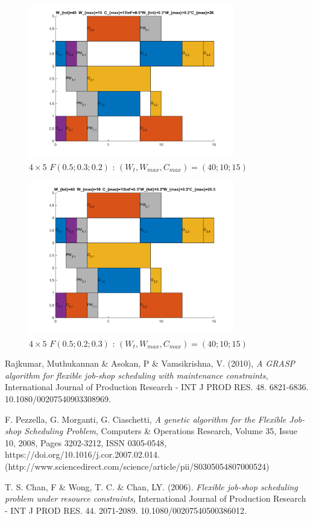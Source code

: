 \documentclass[10pt,a4paper]{scrartcl}
\begin{document}
\begin{figure}
  \centering
  \includegraphics[width=0.8\textwidth]{img/results4x5_F050302.png}
  \caption{$4 \times 5$ $F(0.5;0.3;0.2)$ : $(W_t, W_{max}, C_{max}) = (40; 10; 15)$}
\end{figure}
\begin{figure}
  \centering
  \includegraphics[width=0.8\textwidth]{img/results4x5_F050203.png}
  \caption{$4 \times 5$ $F(0.5;0.2;0.3)$ : $(W_t, W_{max}, C_{max}) = (40; 10; 15)$}
\end{figure}
\clearpage

\begin{thebibliography}{1}
   Rajkumar, Muthukannan \& Asokan, P \& Vamsikrishna, V. (2010),
   \emph{A GRASP algorithm for flexible job-shop scheduling with maintenance constraints},
    International Journal of Production Research - INT J PROD RES. 48. 6821-6836. 10.1080/00207540903308969. 

	F. Pezzella, G. Morganti, G. Ciaschetti,
	\emph{A genetic algorithm for the Flexible Job-shop Scheduling Problem},
	Computers \& Operations Research,
	Volume 35, Issue 10,
	2008,
	Pages 3202-3212,
	ISSN 0305-0548,
	https://doi.org/10.1016/j.cor.2007.02.014.
	(http://www.sciencedirect.com/science/article/pii/S0305054807000524)
	
	T. S. Chan, F \& Wong, T. C. \& Chan, LY. (2006). 
	\emph{Flexible job-shop scheduling problem under resource constraints}, 
	International Journal of Production Research - INT J PROD RES. 44. 2071-2089. 10.1080/00207540500386012. 
\end{thebibliography}
\end{document}
